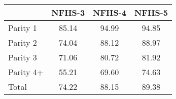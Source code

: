 \begin{tabular}{l*{3}{c}}
\hline\hline
            &\multicolumn{1}{c}{NFHS-3}&\multicolumn{1}{c}{NFHS-4}&\multicolumn{1}{c}{NFHS-5}\\
\hline
\hline
Parity 1    &       85.14&       94.99&       94.85\\
Parity 2    &       74.04&       88.12&       88.97\\
Parity 3    &       71.06&       80.72&       81.92\\
Parity 4+   &       55.21&       69.60&       74.63\\
Total       &       74.22&       88.15&       89.38\\
\hline\hline
\end{tabular}
